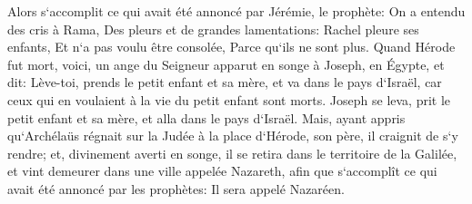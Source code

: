 \verse Alors s`accomplit ce qui avait été annoncé par Jérémie, le prophète: 
\verse On a entendu des cris à Rama, Des pleurs et de grandes lamentations: Rachel pleure ses enfants, Et n`a pas voulu être consolée, Parce qu`ils ne sont plus. 
\verse Quand Hérode fut mort, voici, un ange du Seigneur apparut en songe à Joseph, en Égypte, 
\verse et dit: Lève-toi, prends le petit enfant et sa mère, et va dans le pays d`Israël, car ceux qui en voulaient à la vie du petit enfant sont morts. 
\verse Joseph se leva, prit le petit enfant et sa mère, et alla dans le pays d`Israël. 
\verse Mais, ayant appris qu`Archélaüs régnait sur la Judée à la place d`Hérode, son père, il craignit de s`y rendre; et, divinement averti en songe, il se retira dans le territoire de la Galilée, 
\verse et vint demeurer dans une ville appelée Nazareth, afin que s`accomplît ce qui avait été annoncé par les prophètes: Il sera appelé Nazaréen. 

\chapter{}

